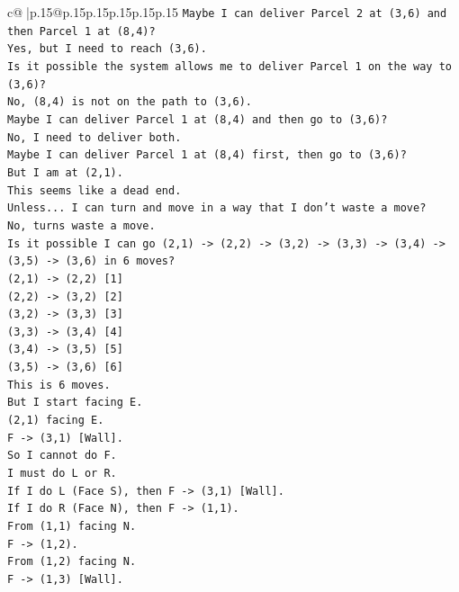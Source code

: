 \documentclass{article}
\begin{document}
{\begin{supertabular}{c@{$\;$}|p{.15\linewidth}@{}p{.15\linewidth}p{.15\linewidth}p{.15\linewidth}p{.15\linewidth}p{.15\linewidth}}
{{{\texttt{Maybe I can deliver Parcel 2 at (3,6) and then Parcel 1 at (8,4)?} \\
\texttt{Yes, but I need to reach (3,6).} \\
\texttt{Is it possible the system allows me to deliver Parcel 1 on the way to (3,6)?} \\
\texttt{No, (8,4) is not on the path to (3,6).} \\
\texttt{Maybe I can deliver Parcel 1 at (8,4) and then go to (3,6)?} \\
\texttt{No, I need to deliver both.} \\
\texttt{Maybe I can deliver Parcel 1 at (8,4) first, then go to (3,6)?} \\
\texttt{But I am at (2,1).} \\
\texttt{This seems like a dead end.} \\
\texttt{Unless... I can turn and move in a way that I don't waste a move?} \\
\texttt{No, turns waste a move.} \\
\texttt{Is it possible I can go (2,1) {-}> (2,2) {-}> (3,2) {-}> (3,3) {-}> (3,4) {-}> (3,5) {-}> (3,6) in 6 moves?} \\
\texttt{(2,1) {-}> (2,2) {[}1{]}} \\
\texttt{(2,2) {-}> (3,2) {[}2{]}} \\
\texttt{(3,2) {-}> (3,3) {[}3{]}} \\
\texttt{(3,3) {-}> (3,4) {[}4{]}} \\
\texttt{(3,4) {-}> (3,5) {[}5{]}} \\
\texttt{(3,5) {-}> (3,6) {[}6{]}} \\
\texttt{This is 6 moves.} \\
\texttt{But I start facing E.} \\
\texttt{(2,1) facing E.} \\
\texttt{F {-}> (3,1) {[}Wall{]}.} \\
\texttt{So I cannot do F.} \\
\texttt{I must do L or R.} \\
\texttt{If I do L (Face S), then F {-}> (3,1) {[}Wall{]}.} \\
\texttt{If I do R (Face N), then F {-}> (1,1).} \\
\texttt{From (1,1) facing N.} \\
\texttt{F {-}> (1,2).} \\
\texttt{From (1,2) facing N.} \\
\texttt{F {-}> (1,3) {[}Wall{]}.} \\
}}}
\end{supertabular}}
\end{document}
